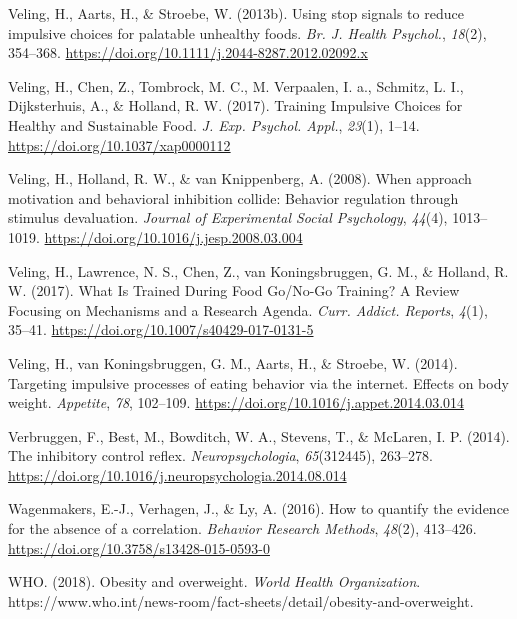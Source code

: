 \documentclass[man,floatsintext]{apa6}
\begin{document}
\leavevmode\hypertarget{ref-veling_using_2013}{}%
Veling, H., Aarts, H., \& Stroebe, W. (2013b). Using stop signals to reduce impulsive choices for palatable unhealthy foods. \emph{Br. J. Health Psychol.}, \emph{18}(2), 354--368. \url{https://doi.org/10.1111/j.2044-8287.2012.02092.x}

\leavevmode\hypertarget{ref-veling_training_2017}{}%
Veling, H., Chen, Z., Tombrock, M. C., M. Verpaalen, I. a., Schmitz, L. I., Dijksterhuis, A., \& Holland, R. W. (2017). Training Impulsive Choices for Healthy and Sustainable Food. \emph{J. Exp. Psychol. Appl.}, \emph{23}(1), 1--14. \url{https://doi.org/10.1037/xap0000112}

\leavevmode\hypertarget{ref-veling_when_2008}{}%
Veling, H., Holland, R. W., \& van Knippenberg, A. (2008). When approach motivation and behavioral inhibition collide: Behavior regulation through stimulus devaluation. \emph{Journal of Experimental Social Psychology}, \emph{44}(4), 1013--1019. \url{https://doi.org/10.1016/j.jesp.2008.03.004}

\leavevmode\hypertarget{ref-veling_what_2017}{}%
Veling, H., Lawrence, N. S., Chen, Z., van Koningsbruggen, G. M., \& Holland, R. W. (2017). What Is Trained During Food Go/No-Go Training? A Review Focusing on Mechanisms and a Research Agenda. \emph{Curr. Addict. Reports}, \emph{4}(1), 35--41. \url{https://doi.org/10.1007/s40429-017-0131-5}

\leavevmode\hypertarget{ref-veling_targeting_2014}{}%
Veling, H., van Koningsbruggen, G. M., Aarts, H., \& Stroebe, W. (2014). Targeting impulsive processes of eating behavior via the internet. Effects on body weight. \emph{Appetite}, \emph{78}, 102--109. \url{https://doi.org/10.1016/j.appet.2014.03.014}

\leavevmode\hypertarget{ref-verbruggen_inhibitory_2014}{}%
Verbruggen, F., Best, M., Bowditch, W. A., Stevens, T., \& McLaren, I. P. (2014). The inhibitory control reflex. \emph{Neuropsychologia}, \emph{65}(312445), 263--278. \url{https://doi.org/10.1016/j.neuropsychologia.2014.08.014}

\leavevmode\hypertarget{ref-wagenmakers_how_2016-1}{}%
Wagenmakers, E.-J., Verhagen, J., \& Ly, A. (2016). How to quantify the evidence for the absence of a correlation. \emph{Behavior Research Methods}, \emph{48}(2), 413--426. \url{https://doi.org/10.3758/s13428-015-0593-0}

\leavevmode\hypertarget{ref-who_obesity_2018}{}%
WHO. (2018). Obesity and overweight. \emph{World Health Organization}. https://www.who.int/news-room/fact-sheets/detail/obesity-and-overweight.
\end{document}
